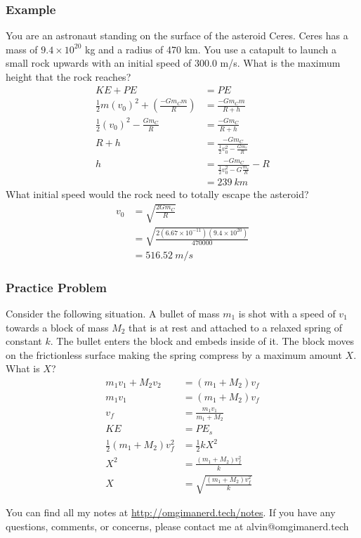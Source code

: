 \documentclass{math}
\begin{document}
\subsubsection*{Example}
You are an astronaut standing on the surface of the asteroid Ceres. Ceres has a
mass of \( 9.4\times10^{20} \) kg and a radius of 470 km. You use a catapult to
launch a small rock upwards with an initial speed of 300.0 m/s. What is the
maximum height that the rock reaches?
\begin{align*}
  KE+PE &= PE \\
  \frac{1}{2}m(v_0)^2+(\frac{-Gm_Cm}{R}) &= \frac{-Gm_Cm}{R+h} \\
  \frac{1}{2}(v_0)^2-\frac{Gm_C}{R} &= \frac{-Gm_C}{R+h} \\
  R+h &= \frac{-Gm_C}{\frac{1}{2}v_0^2-\frac{Gm_c}{R}} \\
  h &= \frac{-Gm_C}{\frac{1}{2}v_0^2-G\frac{m_c}{R}}-R \\
  &= 239~km
\end{align*}
What initial speed would the rock need to totally escape the asteroid?
\begin{align*}
  v_0 &= \sqrt{\frac{2Gm_C}{R}} \\
  &= \sqrt{\frac{2(6.67\times10^{-11})(9.4\times10^{20})}{470000}} \\
  &= 516.52~m/s
\end{align*}

\subsubsection*{Practice Problem}
Consider the following situation. A bullet of mass \( m_1 \) is shot with a
speed of \( v_1 \) towards a block of mass \( M_2 \) that is at rest and
attached to a relaxed spring of constant \( k \). The bullet enters the block
and embeds inside of it. The block moves on the frictionless surface making
the spring compress by a maximum amount \( X \). What is \( X \)?
\begin{align*}
  m_1v_1+M_2v_2 &= (m_1+M_2)v_f \\
  m_1v_1 &= (m_1+M_2)v_f \\
  v_f &= \frac{m_1v_1}{m_1+M_2} \\
  KE &= PE_s \\
  \frac{1}{2}(m_1+M_2)v_f^2 &= \frac{1}{2}kX^2 \\
  X^2 &= \frac{(m_1+M_2)v_f^2}{k} \\
  X &= \sqrt{\frac{(m_1+M_2)v_f^2}{k}}
\end{align*}

\begin{center}
  You can find all my notes at \url{http://omgimanerd.tech/notes}. If you have
  any questions, comments, or concerns, please contact me at
  alvin@omgimanerd.tech
\end{center}
\end{document}
